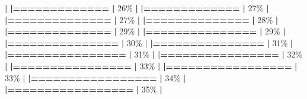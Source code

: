 \documentclass[
]{book}
\newenvironment{Shaded}{\begin{snugshade}}{\end{snugshade}}
\newcommand{\DecValTok}[1]{\textcolor[rgb]{0.00,0.00,0.81}{#1}}
\newcommand{\ErrorTok}[1]{\textcolor[rgb]{0.64,0.00,0.00}{\textbf{#1}}}
\newcommand{\NormalTok}[1]{#1}
\newcommand{\SpecialCharTok}[1]{\textcolor[rgb]{0.81,0.36,0.00}{\textbf{#1}}}
\begin{document}
\begin{Shaded}
\begin{Highlighting}[]
  \SpecialCharTok{|}                                                        
  \ErrorTok{|=============}                                     \ErrorTok{|}  \DecValTok{26}\NormalTok{\%}
  \SpecialCharTok{|}                                                        
  \ErrorTok{|=============}                                     \ErrorTok{|}  \DecValTok{27}\NormalTok{\%}
  \SpecialCharTok{|}                                                        
  \ErrorTok{|==============}                                    \ErrorTok{|}  \DecValTok{27}\NormalTok{\%}
  \SpecialCharTok{|}                                                        
  \ErrorTok{|==============}                                    \ErrorTok{|}  \DecValTok{28}\NormalTok{\%}
  \SpecialCharTok{|}                                                        
  \ErrorTok{|==============}                                    \ErrorTok{|}  \DecValTok{29}\NormalTok{\%}
  \SpecialCharTok{|}                                                        
  \ErrorTok{|===============}                                   \ErrorTok{|}  \DecValTok{29}\NormalTok{\%}
  \SpecialCharTok{|}                                                        
  \ErrorTok{|===============}                                   \ErrorTok{|}  \DecValTok{30}\NormalTok{\%}
  \SpecialCharTok{|}                                                        
  \ErrorTok{|===============}                                   \ErrorTok{|}  \DecValTok{31}\NormalTok{\%}
  \SpecialCharTok{|}                                                        
  \ErrorTok{|================}                                  \ErrorTok{|}  \DecValTok{31}\NormalTok{\%}
  \SpecialCharTok{|}                                                        
  \ErrorTok{|================}                                  \ErrorTok{|}  \DecValTok{32}\NormalTok{\%}
  \SpecialCharTok{|}                                                        
  \ErrorTok{|================}                                  \ErrorTok{|}  \DecValTok{33}\NormalTok{\%}
  \SpecialCharTok{|}                                                        
  \ErrorTok{|=================}                                 \ErrorTok{|}  \DecValTok{33}\NormalTok{\%}
  \SpecialCharTok{|}                                                        
  \ErrorTok{|=================}                                 \ErrorTok{|}  \DecValTok{34}\NormalTok{\%}
  \SpecialCharTok{|}                                                        
  \ErrorTok{|=================}                                 \ErrorTok{|}  \DecValTok{35}\NormalTok{\%}
  \SpecialCharTok{|}                                                        

\end{Highlighting}
\end{Shaded}
\end{document}
